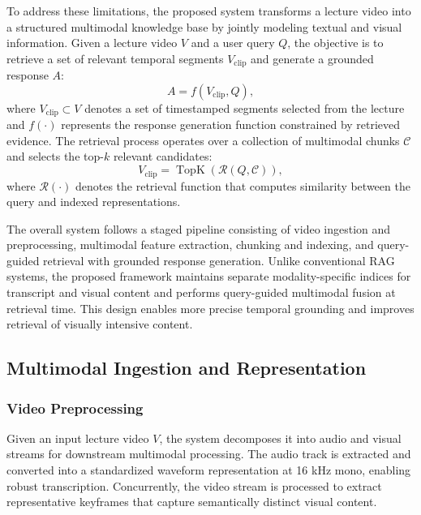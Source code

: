 \documentclass[conference]{IEEEtran}
\begin{document}
    To address these limitations, the proposed system transforms a lecture video into a structured multimodal knowledge base by jointly modeling textual and visual information. Given a lecture video $V$ and a user query $Q$, the objective is to retrieve a set of relevant temporal segments $V_{\text{clip}}$ and generate a grounded response $A$:
    \begin{equation}
    A = f(V_{\text{clip}}, Q),
    \end{equation}
    where $V_{\text{clip}} \subset V$ denotes a set of timestamped segments selected from the lecture and $f(\cdot)$ represents the response generation function constrained by retrieved evidence. The retrieval process operates over a collection of multimodal chunks $\mathcal{C}$ and selects the top-$k$ relevant candidates:
    \begin{equation}
    V_{\text{clip}} = \operatorname{TopK}\left(\mathcal{R}(Q, \mathcal{C})\right),
    \end{equation}
    where $\mathcal{R}(\cdot)$ denotes the retrieval function that computes similarity between the query and indexed representations.

    The overall system follows a staged pipeline consisting of video ingestion and preprocessing, multimodal feature extraction, chunking and indexing, and query-guided retrieval with grounded response generation. Unlike conventional RAG systems, the proposed framework maintains separate modality-specific indices for transcript and visual content and performs query-guided multimodal fusion at retrieval time. This design enables more precise temporal grounding and improves retrieval of visually intensive content.

    \subsection{Multimodal Ingestion and Representation}

    \subsubsection{Video Preprocessing}

    Given an input lecture video $V$, the system decomposes it into audio and visual streams for downstream multimodal processing. The audio track is extracted and converted into a standardized waveform representation at 16 kHz mono, enabling robust transcription. Concurrently, the video stream is processed to extract representative keyframes that capture semantically distinct visual content.
\end{document}
